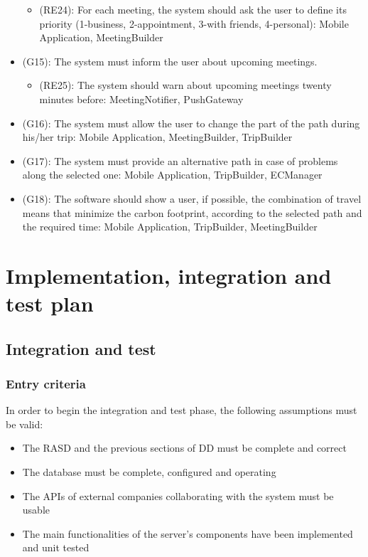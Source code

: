 \documentclass[a4paper,leqno]{article}
\begin{document}
\begin{itemize}
\begin{itemize}
		\item (RE24): For each meeting, the system should ask the user to define its priority (1-business, 2-appointment, 3-with friends, 4-personal): Mobile Application, MeetingBuilder
	\end{itemize}
	\item (G15): The system must inform the user about upcoming meetings.
	\begin{itemize}
		\item (RE25): The system should warn about upcoming meetings twenty minutes before: MeetingNotifier, PushGateway
	\end{itemize}
	\item (G16): The system must allow the user to change the part of the path during his/her trip: Mobile Application, MeetingBuilder, TripBuilder
	\item (G17): The system must provide an alternative path in case of problems along the selected one: Mobile Application, TripBuilder, ECManager
	\item (G18): The software should show a user, if possible, the combination of travel means that minimize the carbon footprint, according to the selected path and the required time: Mobile Application, TripBuilder, MeetingBuilder
	
\end{itemize} 

\newpage
\section{Implementation, integration and test plan}

\subsection{Integration and test}

\subsubsection{Entry criteria}
In order to begin the integration and test phase, the following assumptions must be valid:

\begin{itemize}
	\item The RASD and the previous sections of DD must be complete and correct
	\item The database must be complete, configured and operating
	\item The APIs of external companies collaborating with the system must be usable
	\item The main functionalities of the server's components have been implemented and unit tested
\end{itemize}
\end{document}
